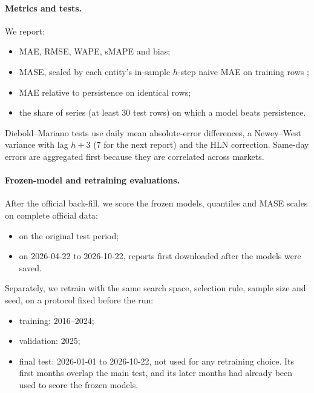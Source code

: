 \paragraph{Metrics and tests.}
We report:
\begin{itemize}
  \item MAE, RMSE, WAPE, sMAPE and bias;
  \item MASE, scaled by each entity's in-sample $h$-step naive MAE on training rows \cite{hyndman2006another};
  \item MAE relative to persistence on identical rows;
  \item the share of series (at least 30 test rows) on which a model beats persistence.
\end{itemize}
Diebold--Mariano tests \cite{diebold1995comparing} use daily mean absolute-error differences, a Newey--West variance with lag $h+3$ (7 for the next report) and the HLN correction. Same-day errors are aggregated first because they are correlated across markets.

\paragraph{Frozen-model and retraining evaluations.}
After the official back-fill, we score the frozen models, quantiles and MASE scales on complete official data:
\begin{itemize}
  \item on the original test period;
  \item on 2026-04-22 to 2026-10-22, reports first downloaded after the models were saved.
\end{itemize}
Separately, we retrain with the same search space, selection rule, sample size and seed, on a protocol fixed before the run:
\begin{itemize}
  \item training: 2016--2024;
  \item validation: 2025;
  \item final test: 2026-01-01 to 2026-10-22, not used for any retraining choice. Its first months overlap the main test, and its later months had already been used to score the frozen models.
\end{itemize}


